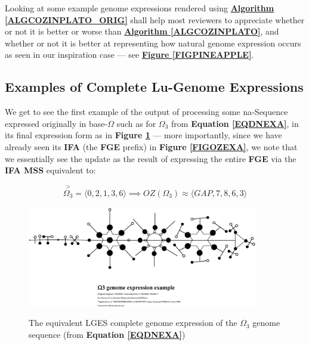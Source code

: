 \documentclass[a4paper, 18pt]{book} %
\begin{document}
\begin{appendices}
Looking at some example genome expressions rendered using \textbf{\hyperref[ALGCOZINPLATO_ORIG]{Algorithm \ref{ALGCOZINPLATO_ORIG}}} shall help most reviewers to appreciate whether or not it is better or worse than \textbf{\hyperref[ALGCOZINPLATO]{Algorithm \ref{ALGCOZINPLATO}}}, and whether or not it is better at representing how natural genome expression occurs as seen in our inspiration case --- see \textbf{\hyperref[FIGPINEAPPLE]{Figure \ref{FIGPINEAPPLE}}}.

\subsection{Examples of Complete Lu-Genome Expressions}
\label{SECFULLGES_ORIG}

We get to see the first example of the output of processing some na-Sequence expressed originally in base-$\Omega$ such as for $\Omega_{3}$ from \textbf{Equation \ref{EQDNEXA}}, in its final expression form as in \textbf{Figure \ref{FIGPLATONICEXA_ORIG}}\cite{lutalo_2025_exa} --- more importantly, since we have already seen its \textbf{IFA} (the \textbf{FGE} prefix) in \textbf{Figure \ref{FIGOZEXA}}, we note that we essentially see the update as the result of expressing the entire \textbf{FGE} via the \textbf{IFA MSS} equivalent to:

\begin{equation}
\overset{>}{\Omega_{3}} = \langle 0, 2, 1, 3, 6 \rangle \implies \boxed{OZ(\Omega_{3})} \approx \langle GAP, 7, 8, 6, 3 \rangle
\end{equation}


\begin{figure}[H]
  \begin{center}
   \includegraphics[trim=0cm 0cm 0cm 0cm, clip, width=0.9\textwidth,]{resources/pdfs/PLATONIC-EXA-landscape_ORIG.pdf}\\
   \caption{The equivalent LGES complete genome expression of the $\Omega_{3}$ genome sequence (from \textbf{Equation \ref{EQDNEXA}})}
  \label{FIGPLATONICEXA_ORIG}
  \end{center}
\end{figure}



\end{appendices}
\end{document}
